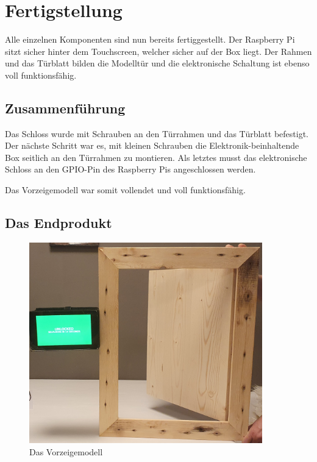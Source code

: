 \chapter{Fertigstellung}
Alle einzelnen Komponenten sind nun bereits fertiggestellt. Der Raspberry Pi sitzt sicher hinter
dem Touchscreen, welcher sicher auf der Box liegt. Der Rahmen und das Türblatt bilden die
Modelltür und die elektronische Schaltung ist ebenso voll funktionsfähig.

\section{Zusammenführung}

Das Schloss wurde mit Schrauben an den Türrahmen und das Türblatt befestigt.
Der nächste Schritt war es, mit kleinen Schrauben die Elektronik-beinhaltende Box
seitlich an den Türrahmen zu montieren.
Als letztes musst das elektronische Schloss an den GPIO-Pin des Raspberry Pis angeschlossen werden.

Das Vorzeigemodell war somit vollendet und voll funktionsfähig.

\section{Das Endprodukt}
\begin{figure}[H]
    \begin{center}
        \includegraphics[width=0.9\textwidth]{images/core/fertig.jpg}
        \caption{Das Vorzeigemodell}
    \end{center}
\end{figure}